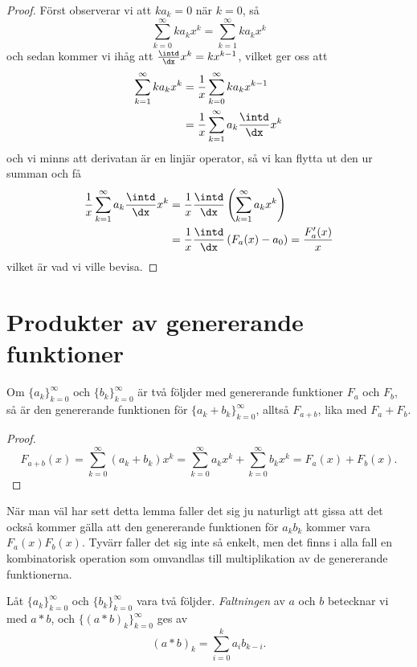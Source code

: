 \documentclass[nobib]{tufte-handout}
\begin{document}
\begin{lemma}
\begin{proof}
        Först observerar vi att $ka_k=0$ när $k=0$, så
        $$\sum_{k=0}^{\infty} k a_k x^k = \sum_{k=1}^{\infty} k a_k x^k$$
        och sedan kommer vi ihåg att $\frac{\intd}{\dx} x^{k} = k x^{k-1}$, vilket ger oss att
        \begin{align*}
            \sum_{k=1}^{\infty} k a_k x^k &= \frac{1}{x}\sum_{k=0}^{\infty} k a_k x^{k-1}\\
            &= \frac{1}{x}\sum_{k=1}^{\infty} a_k \frac{\intd}{\dx} x^k
        \end{align*}
        och vi minns att derivatan är en linjär operator, så vi kan flytta ut den ur summan och få
        \begin{align*}
            \frac{1}{x}\sum_{k=1}^{\infty} a_k \frac{\intd}{\dx} x^k &= \frac{1}{x} \frac{\intd}{\dx} \left(\sum_{k=1}^{\infty} a_k x^k\right)\\
            &= \frac{1}{x}\frac{\intd}{\dx}\left(F_a(x) - a_0\right) = \frac{F_a'(x)}{x}
        \end{align*}
        vilket är vad vi ville bevisa.
    \end{proof}
\end{lemma}

\section{Produkter av genererande funktioner}

\begin{lemma}
    Om $\{a_k\}_{k=0}^\infty$ och $\{b_k\}_{k=0}^\infty$ är två följder med genererande funktioner $F_a$ och $F_b$, så är den genererande funktionen för $\{a_k + b_k\}_{k=0}^\infty$, alltså $F_{a + b}$, lika med $F_a + F_b$.
    \begin{proof}
        $$F_{a + b}(x) = \sum_{k = 0}^{\infty} (a_k + b_k)x^k = \sum_{k = 0}^{\infty} a_k x^k + \sum_{k = 0}^{\infty} b_k x^k = F_a(x) + F_b(x).$$
    \end{proof}
\end{lemma}

När man väl har sett detta lemma faller det sig ju naturligt att gissa att det också kommer gälla att den genererande funktionen för $a_k b_k$ kommer vara $F_a(x)F_b(x)$. Tyvärr faller det sig inte så enkelt, men det finns i alla fall en kombinatorisk operation som omvandlas till multiplikation av de genererande funktionerna.

\begin{definition}
    Låt $\{a_k\}_{k=0}^\infty$ och $\{b_k\}_{k=0}^\infty$ vara två följder. \emph{Faltningen} av $a$ och $b$ betecknar vi med $a*b$, och $\{(a * b)_k\}_{k=0}^\infty$ ges av
    $$(a*b)_k = \sum_{i=0}^{k} a_i b_{k-i}.$$
\end{definition}
\end{document}
